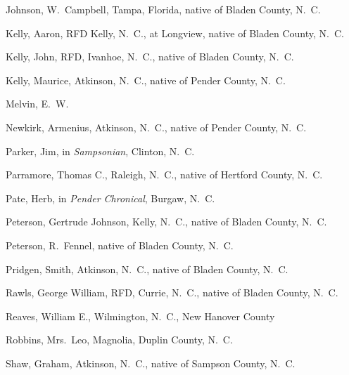 \documentclass[11pt, a5paper, openright]{book}
\begin{document}
\begin{thebibliography}{99}
  Johnson, W.~Campbell, Tampa, Florida, native of Bladen County, N.~C.

  Kelly, Aaron, RFD Kelly, N.~C., at Longview, native of Bladen County, N.~C.

  Kelly, John, RFD, Ivanhoe, N.~C., native of Bladen County, N.~C.

  Kelly, Maurice, Atkinson, N.~C., native of Pender County, N.~C.

  Melvin, E.~W.

  Newkirk, Armenius, Atkinson, N.~C., native of Pender County, N.~C.

  Parker, Jim, in \textit{Sampsonian}, Clinton, N.~C.

  Parramore, Thomas C., Raleigh, N.~C., native of Hertford County, N.~C.

  Pate, Herb, in \textit{Pender Chronical}, Burgaw, N.~C.

  Peterson, Gertrude Johnson, Kelly, N.~C., native of Bladen County, N.~C.

  Peterson, R.~Fennel, native of Bladen County, N.~C.

  Pridgen, Smith, Atkinson, N.~C., native of Bladen County, N.~C.

  Rawls, George William, RFD, Currie, N.~C., native of Bladen County, N.~C.

  Reaves, William E., Wilmington, N.~C., New Hanover County

  Robbins, Mrs.~Leo, Magnolia, Duplin County, N.~C.

  Shaw, Graham, Atkinson, N.~C., native of Sampson County, N.~C.


\end{thebibliography}
\end{document}
